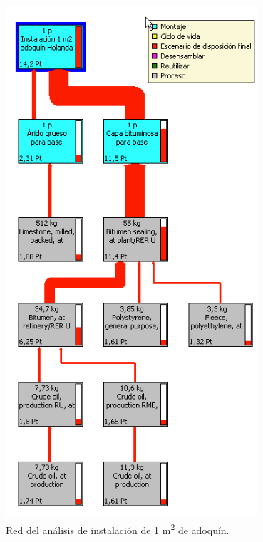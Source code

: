 \begin{figure}[!htb]
\centering
\includegraphics[height=19cm]{instalacion_red.png}
\caption{Red del análisis de instalación de 1 \si{m^2} de adoquín.}
\label{fig:redinstalacion}
\end{figure}
